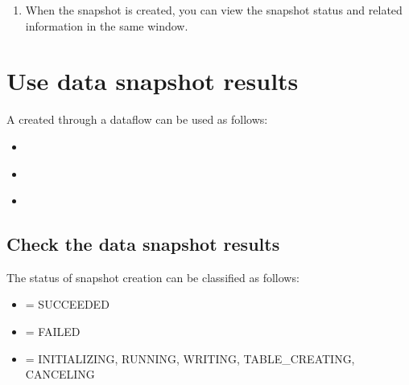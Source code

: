 \documentclass[letterpaper,10pt,english]{sphinxmanual}
\begin{document}
\begin{enumerate}
\begin{quote}
\begin{itemize}
\end{itemize}
\end{quote}

\item {} 
When the snapshot is created, you can view the snapshot status and related information in the same window.
\begin{quote}

\begin{figure}[H]
\centering

\noindent{}
\end{figure}
\end{quote}

\end{enumerate}


\section{Use data snapshot results}
\label{\detokenize{discovery/part07/data_snapshot:id1}}\label{\detokenize{discovery/part07/data_snapshot::doc}}
A  created through a dataflow can be used as follows:
\begin{itemize}
\item {} 
{\hyperref[\detokenize{discovery/part07/data_snapshot:snapshot-result-check}]{}}

\item {} 
{\hyperref[\detokenize{discovery/part07/data_snapshot:snapshot-into-druid}]{}}

\item {} 
{\hyperref[\detokenize{discovery/part07/data_snapshot:snapshot-into-csv}]{}}

\end{itemize}


\subsection{Check the data snapshot results}
\label{\detokenize{discovery/part07/data_snapshot:snapshot-result-check}}\label{\detokenize{discovery/part07/data_snapshot:id2}}
The status of snapshot creation can be classified as follows:
\begin{itemize}
\item {} 
 = SUCCEEDED

\item {} 
 = FAILED

\item {} 
 = INITIALIZING, RUNNING, WRITING, TABLE\_CREATING, CANCELING

\end{itemize}
\end{document}
